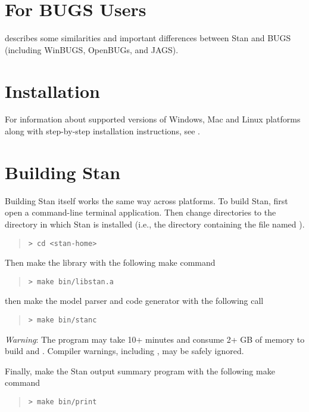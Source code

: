 \section{For BUGS Users}

 describes some similarities
and important differences between Stan and BUGS (including WinBUGS,
OpenBUGs, and JAGS).


\section{Installation}

For information about supported versions of Windows, Mac and Linux
platforms along with step-by-step installation instructions, see
.

\section{Building Stan}

Building Stan itself works the same way across platforms.
To build Stan, first open a command-line terminal application.  Then change
directories to the directory in which Stan is installed (i.e., the
directory containing the file named ).
%
\begin{quote}
\begin{Verbatim}[fontshape=sl]
> cd <stan-home>
\end{Verbatim}
\end{quote}
%
Then make the library with the following make command
%
\begin{quote}
\begin{Verbatim}[fontshape=sl]
> make bin/libstan.a
\end{Verbatim}
\end{quote}
%
then make the model parser and code generator with the following call
%
\begin{quote}
\begin{Verbatim}[fontshape=sl]
> make bin/stanc
\end{Verbatim}
\end{quote}
%
\emph{Warning}: The  program may take 10+ minutes and
consume 2+ GB of memory to build  and .
Compiler warnings, including , may be safely ignored.
 
Finally, make the Stan output summary program with the following
make command
%
\begin{quote}
\begin{Verbatim}[fontshape=sl]
> make bin/print
\end{Verbatim}
\end{quote}
%

